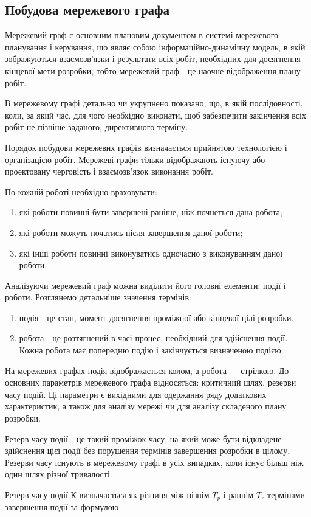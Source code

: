 \subsection{Побудова мережевого графа}
Мережевий граф є основним плановим документом в системі мережевого планування і керування, що являє собою інформаційно-динамічну модель, в якій зображуються взаємозв'язки і результати всіх робіт, необхідних для досягнення кінцевої мети розробки, тобто мережевий граф - це наочне відображення плану робіт.
\par В мережевому графі детально чи укрупнено показано, що, в якій послідовності, коли, за який час, для чого необхідно виконати, щоб забезпечити закінчення всіх робіт не пізніше заданого, директивного терміну.
\par Порядок побудови мережевих графів визначається прийнятою технологією і організацією робіт. Мережеві графи тільки відображають існуючу або проектовану черговість і взаємозв'язок виконання робіт.
\par По кожній роботі необхідно враховувати:
\begin{enumerate}
	\item які роботи повинні бути завершені раніше, ніж почнеться дана робота;
	\item які роботи можуть початись після завершення даної роботи;
	\item які інші роботи повинні виконуватись одночасно з виконуванням даної роботи.
\end{enumerate}
\par Аналізуючи мережевий граф можна виділити його головні елементи: події і роботи. Розглянемо детальніше значення термінів:
\begin{enumerate}
	\item подія - це стан, момент досягнення проміжної або кінцевої цілі розробки.
	\item робота - це розтягнений в часі процес, необхідний для здійснення події. Кожна робота має попередню подію і закінчується визначеною подією.
\end{enumerate}

\par На мережевих графах подія відображається колом, а робота --- стрілкою. До основних параметрів мережевого графа відносяться: критичний шлях, резерви часу подій. Ці параметри є вихідними для одержання ряду додаткових характеристик, а також для аналізу мережі чи для аналізу складеного плану розробки.
\par Резерв часу події - це такий проміжок часу, на який може бути відкладене здійснення цієї події без порушення термінів завершення розробки в цілому. Резерви часу існують в мережевому графі в усіх випадках, коли існує більш ніж один шлях різної тривалості.
\par Резерв часу події К визначається як різниця між пізнім $T_{p}$ і раннім $T_{r}$ термінами завершення події за формулою

